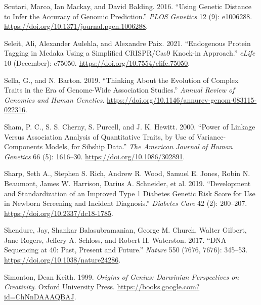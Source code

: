 \documentclass[
]{book}
\newlength{\cslhangindent}
\newlength{\cslentryspacingunit} %
\newenvironment{CSLReferences}[2] %
 {%
  \setlength{\parindent}{0pt}
  \ifodd #1
  \let\oldpar\par
  \def\par{\hangindent=\cslhangindent\oldpar}
  \fi
  \setlength{\parskip}{#2\cslentryspacingunit}
 }%
 {}
\begin{document}
\begin{CSLReferences}{1}{0}
\leavevmode{}%
Scutari, Marco, Ian Mackay, and David Balding. 2016. {``Using {Genetic Distance} to {Infer} the {Accuracy} of {Genomic Prediction}.''} \emph{PLOS Genetics} 12 (9): e1006288. \url{https://doi.org/10.1371/journal.pgen.1006288}.

\leavevmode{}%
Seleit, Ali, Alexander Aulehla, and Alexandre Paix. 2021. {``Endogenous Protein Tagging in Medaka Using a Simplified {CRISPR}/{Cas9} Knock-in Approach.''} \emph{eLife} 10 (December): e75050. \url{https://doi.org/10.7554/elife.75050}.

\leavevmode{}%
Sella, G., and N. Barton. 2019. {``Thinking {About} the {Evolution} of {Complex Traits} in the {Era} of {Genome-Wide Association Studies}.''} \emph{Annual Review of Genomics and Human Genetics}. \url{https://doi.org/10.1146/annurev-genom-083115-022316}.

\leavevmode{}%
Sham, P. C., S. S. Cherny, S. Purcell, and J. K. Hewitt. 2000. {``Power of {Linkage} Versus {Association Analysis} of {Quantitative Traits}, by {Use} of {Variance-Components Models}, for {Sibship Data}.''} \emph{The American Journal of Human Genetics} 66 (5): 1616--30. \url{https://doi.org/10.1086/302891}.

\leavevmode{}%
Sharp, Seth A., Stephen S. Rich, Andrew R. Wood, Samuel E. Jones, Robin N. Beaumont, James W. Harrison, Darius A. Schneider, et al. 2019. {``Development and {Standardization} of an {Improved Type} 1 {Diabetes Genetic Risk Score} for {Use} in {Newborn Screening} and {Incident Diagnosis}.''} \emph{Diabetes Care} 42 (2): 200--207. \url{https://doi.org/10.2337/dc18-1785}.

\leavevmode{}%
Shendure, Jay, Shankar Balasubramanian, George M. Church, Walter Gilbert, Jane Rogers, Jeffery A. Schloss, and Robert H. Waterston. 2017. {``{DNA} Sequencing at 40: Past, Present and Future.''} \emph{Nature} 550 (7676, 7676): 345--53. \url{https://doi.org/10.1038/nature24286}.

\leavevmode{}%
Simonton, Dean Keith. 1999. \emph{Origins of {Genius}: {Darwinian Perspectives} on {Creativity}}. {Oxford University Press}. \url{https://books.google.com?id=ChNnDAAAQBAJ}.


\end{CSLReferences}
\end{document}
